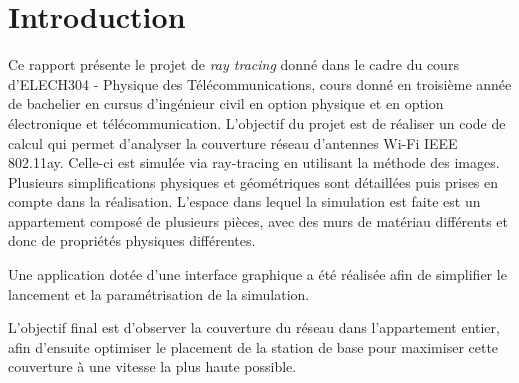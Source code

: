\chapter*{Introduction}
\label{introduction}
Ce rapport présente le projet de \textit{ray tracing} donné dans le cadre du cours d'ELECH304 - Physique des Télécommunications, cours donné en troisième année de bachelier en cursus d'ingénieur civil en option physique et en option électronique et télécommunication.
L'objectif du projet est de réaliser un code de calcul qui permet d'analyser la couverture réseau d'antennes Wi-Fi IEEE 802.11ay.
Celle-ci est simulée via ray-tracing en utilisant la méthode des images. Plusieurs simplifications physiques et géométriques sont détaillées puis prises en compte dans la réalisation.
L'espace dans lequel la simulation est faite est un appartement composé de plusieurs pièces, avec des murs de matériau différents et donc de propriétés physiques différentes.

Une application dotée d'une interface graphique a été réalisée afin de simplifier le lancement et la paramétrisation de la simulation.

L'objectif final est d'observer la couverture du réseau dans l'appartement entier, afin d'ensuite optimiser le placement de la station de base pour maximiser cette couverture à une vitesse la plus haute possible.%
